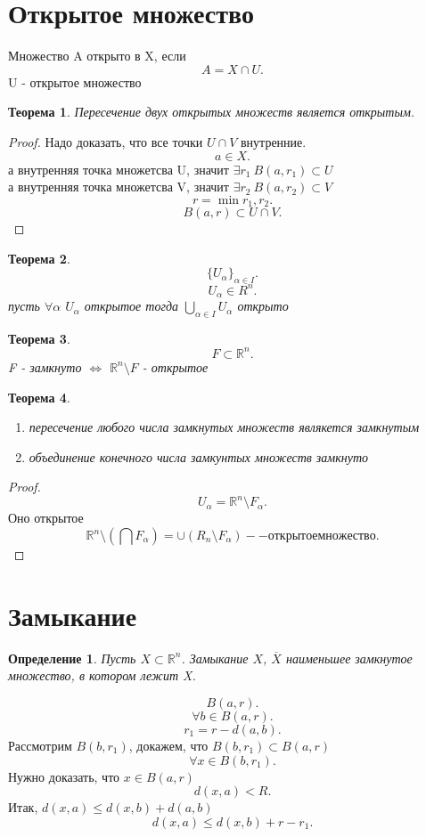 \documentclass[14pt]{extarticle}
\newtheorem{theorem}{Теорема}
\newtheorem{definition}{Определение}
\begin{document}
\section{Открытое множество}
Множество A открыто в  X, если
\[
	A = X \cap U
	.\]
U - открытое множество
\begin{theorem}
	Пересечение двух открытых множеств является открытым.
\end{theorem}
\begin{proof}
	Надо доказать, что все точки $U \cap V$ внутренние.\\
	\[
		a \in X
		.\]
	а внутренняя точка множетсва U, значит  $\exists r_1  ~ B(a,r_1) \subset U$\\
	а внутренняя точка множетсва V, значит  $\exists r_2  ~ B(a,r_2) \subset V$
	\[
		r = \min{r_1,r_2}
		.\]
	\[
		B(a,r) \subset U \cap V
		.\]
\end{proof}
\begin{theorem}
	\[
		\{U_{\alpha}\}_{\alpha \in I}
		.\]
	\[
		U_{\alpha} \in R^{n}
		.\]
	пусть $\forall  \alpha$ $U_{\alpha}$ открытое
	тогда $\bigcup_{\alpha \in I} U_{\alpha}$ открыто
\end{theorem}
\begin{theorem}
	\[
		F \subset \mathbb{R}^{n}
		.\]
	F - замкнуто $\iff$  $\mathbb{R}^{n} \setminus F$ - открытое
\end{theorem}
\begin{theorem}
	\begin{enumerate}
		\item пересечение любого числа замкнутых множеств являкется замкнутым
		\item объединение конечного числа замкунтых множеств замкнуто
	\end{enumerate}
\end{theorem}
\begin{proof}
	\[
		U_{\alpha} = \mathbb{R}^{n} \setminus F_{\alpha}
		.\]
	Оно открытое
	\[
		\mathbb{R}^{n} \setminus (\bigcap F_{\alpha}) =
		\cup (R_{n} \setminus F_{\alpha}) -- открытое множество
		.\]
\end{proof}
\section{Замыкание}
\begin{definition}
	Пусть $X \subset \mathbb{R}^{n}$. Замыкание $X$,  $\overline{X}$ наименьшее замкнутое множество, в котором лежит X.
\end{definition}
\[
	B(a,r)
	.\]
\[
	\forall  b \in B(a,r)
	.\]
\[
	r_1 = r - d(a,b)
	.\]
Рассмотрим $B(b,r_1)$, докажем, что $B(b,r_1) \subset B(a,r)$
\[
	\forall  x \in B(b,r_1)
	.\]
Нужно доказать, что $x \in B(a,r)$
\[
	d(x,a) < R
	.\]
Итак, $d(x,a) \le  d(x,b) + d(a,b)$
\[
	d(x,a) \le  d(x,b) + r - r_1
	.\]
\end{document}
